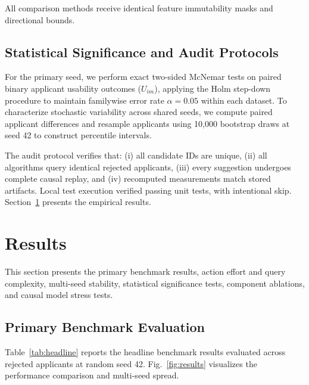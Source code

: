 \documentclass[nolineno]{paper/ieee-access/ieeeaccess}%
\newcommand{\CAC}{CAC}
\begin{document}
All comparison methods receive identical feature immutability masks and directional bounds.

\subsection{Statistical Significance and Audit Protocols}
For the primary seed, we perform exact two-sided McNemar tests on paired binary applicant usability outcomes ($U_{im}$), applying the Holm step-down procedure to maintain familywise error rate $\alpha=0.05$ within each dataset. To characterize stochastic variability across shared seeds, we compute paired applicant differences and resample applicants using 10,000 bootstrap draws at seed 42 to construct percentile intervals.

The audit protocol verifies that: (i) all candidate IDs are unique, (ii) all algorithms query identical rejected applicants, (iii) every suggestion undergoes complete causal replay, and (iv) recomputed measurements match stored artifacts. Local test execution verified \TestsPassed{} passing unit tests, with \TestsSkipped{} intentional skip. Section~\ref{sec:results} presents the empirical results.

\section{Results}
\label{sec:results}
This section presents the primary benchmark results, action effort and query complexity, multi-seed stability, statistical significance tests, component ablations, and causal model stress tests.

\begin{table}[t]
\caption{Checked main results at search seed 42. Rates are percentages of all
queried applicants: validity ($V$), replay success ($R$), actionability ($A$),
state fidelity ($F$), and usability ($U$). Any passing suggestion counts for
each column, but $U$ needs $R$ and $A$ to pass on the same suggestion. Cost is
the mean scaled effort of the cheapest usable plan for each successful
applicant. That applicant group can differ by method. Queries are mean
scored input rows per applicant; they exclude shared query-set selection
and later checks. Blue rows show \CAC{}.}
\label{tab:headline}
\centering\small

\end{table}

\subsection{Primary Benchmark Evaluation}
Table~\ref{tab:headline} reports the headline benchmark results evaluated across \TotalApplicants{} rejected applicants at random seed 42. Fig.~\ref{fig:results} visualizes the performance comparison and multi-seed spread.
\end{document}
